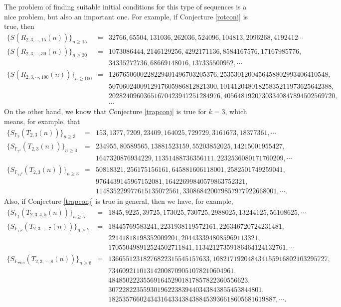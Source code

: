 The problem of finding suitable initial conditions for this type of sequences is a nice problem, but also an important one.  For example, if 
Conjecture \ref{rotconj} is true, then 
\begin{eqnarray*}
 \{S(R_{2,3,\cdots,15}(n))\}_{n\geq 15} &=& 32766, 65504, 131036, 262036, 524096, 104813,2096268, 4192412\cdots \\
 \{S(R_{2,3,\cdots,30}(n))\}_{n\geq 30}&=&1073086444, 2146129256, 4292171136, 8584167576, 17167985776,\\
 && 34335272736, 68669148016, 137335500952,\cdots\\
 \{S(R_{2,3,\cdots,100}(n))\}_{n\geq 100}&=& 1267650600228229401496703205376, 2535301200456458802993406410548,\\
&&5070602400912917605986812821300, 10141204801825835211973625642388, \\
&&20282409603651670423947251284976, 40564819207303340847894502569720, \\
&&\cdots
\end{eqnarray*}
On the other hand, we know that Conjecture \ref{trapconj} is true for $k=3$, which means, for example, that
\begin{eqnarray*}
 \{S_{\mathbb{F}_9}(T_{2,3}(n))\}_{n\geq 3} &=& 153, 1377, 7209, 23409, 164025, 729729, 3161673, 18377361,\cdots\\
 \{S_{\mathbb{F}_{7^3}}(T_{2,3}(n))\}_{n\geq 3} &=& 234955, 80589565, 13881523159, 55203852025, 14215001955427,\\
&&1647320876934229, 11351488736356111, 2232536080171760209,\cdots\\
 \{S_{\mathbb{F}_{71^2}}(T_{2,3}(n))\}_{n\geq 3} &=& 50818321, 256175156161, 645881606118001, 2582501749259041, \\
&& 9764439145967152081, 16422699840579863752321, \\
&&114835229977615135072561, 330868420079857977922668001,\cdots.
\end{eqnarray*}
Also, if Conjecture \ref{trapconj} is true in general, then we have, for example, 
\begin{eqnarray*}
 \{S_{\mathbb{F}_5}(T_{2,3,4,5}(n))\}_{n\geq 5} &=& 1845, 9225, 39725, 173025, 730725, 2988025, 13244125, 56108625,\cdots\\
 \{S_{\mathbb{F}_{11^2}}(T_{2,3,\cdots, 7}(n))\}_{n\geq 7} &=& 18445769583241, 2231938119572161, 226346720724231481,\\
&&22141818198352009201, 2044333948085969113321,\\
&& 170550498912524502711841, 11342127359186464124132761,\cdots\\
 \{S_{\mathbb{F}_{7919}}(T_{2,3,\cdots,8}(n))\}_{n\geq 8} &=& 13665512318276822315545157633, 108217192048434155916802103295727, \\
&&734609211013142008709051078210604961,\\ 
&&4848502223556916452901817857822360556623,\\
&&30722822355930196223839440343843855453844801, \\
&&182535766024343164334384388453936618605681619887,\cdots.
\end{eqnarray*}

